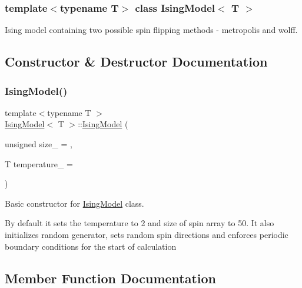 \subsubsection*{template$<$typename T$>$\newline
class Ising\+Model$<$ T $>$}

Ising model containing two possible spin flipping methods -\/ metropolis and wolff. 

\subsection{Constructor \& Destructor Documentation}
\mbox{\label{classIsingModel_a3c9a903d3ddada5ce514ba66f99b0282}} 
\subsubsection{\texorpdfstring{Ising\+Model()}{IsingModel()}}
{\footnotesize\ttfamily template$<$typename T $>$ \\
\mbox{\hyperlink{classIsingModel}{Ising\+Model}}$<$ T $>$\+::\mbox{\hyperlink{classIsingModel}{Ising\+Model}} (\begin{DoxyParamCaption}\item[{unsigned}]{size\+\_\+ = {},  }\item[{T}]{temperature\+\_\+ = {} }\end{DoxyParamCaption})\hspace{0.3cm}{\ttfamily [inline]}}



Basic constructor for \mbox{\hyperlink{classIsingModel}{Ising\+Model}} class. 

By default it sets the temperature to 2 and size of spin array to 50. It also initializes random generator, sets random spin directions and enforces periodic boundary conditions for the start of calculation 

\subsection{Member Function Documentation}
\mbox{\label{classIsingModel_a0a387ccae720604f4de13d5b0762ac62}} 
